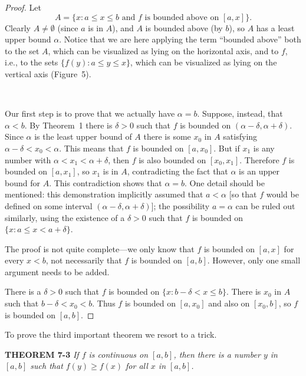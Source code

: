 \begin{proof}
Let
\[
A = \{x : a \leq x \leq b\text{ and $f$ is bounded above on $[a,x]$}\}.
\]
Clearly $A \neq \emptyset$ (since $a$ is in $A$), and $A$ is bounded above
(by $b$), so $A$ has a least upper bound $\alpha$. Notice that we are here
applying the term ``bounded above'' both to the set $A$, which can be
visualized as lying on the horizontal axis, and to $f$, i.e., to the sets
$\{f(y) : a \leq y \leq x\}$, which can be visualized as lying on the
vertical axis (Figure~5).
\begin{center}
\\[0.6em]
\end{center}

Our first step is to prove that we actually have $\alpha = b$. Suppose,
instead, that $\alpha < b$. By Theorem~1 there is $\delta > 0$ such that $f$
is bounded on $(\alpha - \delta, \alpha + \delta)$. Since $\alpha$ is the
least upper bound of $A$ there is some $x_0$ in $A$ satisfying
$\alpha - \delta < x_0 < \alpha$. This means that $f$ is bounded on
$[a,x_0]$. But if $x_1$ is any number with $\alpha < x_1 < \alpha + \delta$,
then $f$ is also bounded on $[x_0,x_1]$. Therefore $f$ is bounded on
$[a,x_1]$, so $x_1$ is in $A$, contradicting the fact that $\alpha$ is an
upper bound for $A$. This contradiction shows that $\alpha = b$. One detail
should be mentioned: this demonstration implicitly assumed that $a < \alpha$
[so that $f$ would be defined on some interval
$(\alpha - \delta, \alpha + \delta)$]; the possibility $a = \alpha$ can be
ruled out similarly, using the existence of a $\delta > 0$ such that $f$ is
bounded on $\{x : a \leq x < a + \delta\}$.

The proof is not quite complete---we only know that $f$ is bounded on
$[a,x]$ for every $x < b$, not necessarily that $f$ is bounded on $[a,b]$.
However, only one small argument needs to be added.

There is a $\delta > 0$ such that $f$ is bounded on
$\{x : b - \delta < x \leq b\}$. There is $x_0$ in $A$ such that
$b - \delta < x_0 < b$. Thus $f$ is bounded on $[a,x_0]$ and also on
$[x_0,b]$, so $f$ is bounded on $[a,b]$.
\end{proof}

To prove the third important theorem we resort to a trick.

\medskip
\noindent\textbf{THEOREM 7-3}\enspace
\textit{If $f$ is continuous on $[a,b]$, then there is a number $y$ in
$[a,b]$ such that $f(y) \geq f(x)$ for all $x$ in $[a,b]$.}

